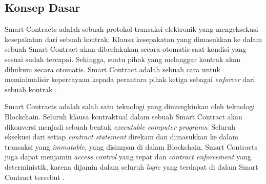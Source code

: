 \subsection{Konsep Dasar}
\label{subsec:konsep-dasar}

Smart Contracts adalah sebuah protokol transaksi elektronik yang mengeksekusi kesepakatan dari sebuah kontrak. Klausa kesepakatan yang dimasukkan ke dalam sebuah Smart Contract akan diberlakukan secara otomatis saat kondisi yang sesuai sudah tercapai. Sehingga, suatu pihak yang melanggar kontrak akan dihukum secara otomatis. Smart Contract adalah sebuah cara untuk meminimalisir kepercayaan kepada perantara pihak ketiga sebagai \textit{enforcer} dari sebuah kontrak \parencite{szabo1997formalizing}.

Smart Contracts adalah salah satu teknologi yang dimungkinkan oleh teknologi Blockchain. Seluruh klausa kontraktual dalam sebuah Smart Contract akan dikonversi menjadi sebuah bentuk \textit{executable computer programs}. Seluruh eksekusi dari setiap \textit{contract statement} direkam dan dimasukkan ke dalam transaksi yang \textit{immutable}, yang disimpan di dalam Blockchain. Smart Contracts juga dapat menjamin \textit{access control} yang tepat dan \textit{contract enforcement} yang deterministik, karena dijamin dalam seluruh \textit{logic} yang terdapat di dalam Smart Contract tersebut \parencite{zheng2020overview}.

